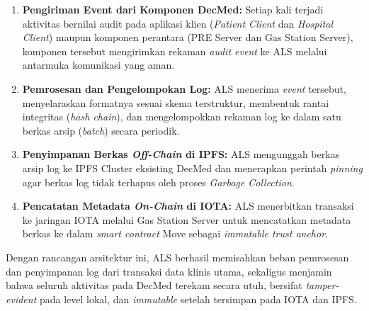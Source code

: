 \begin{enumerate}
    \item \textbf{Pengiriman Event dari Komponen DecMed:} Setiap kali terjadi aktivitas bernilai audit pada aplikasi klien (\textit{Patient Client} dan \textit{Hospital Client}) maupun komponen perantara (PRE Server dan Gas Station Server), komponen tersebut mengirimkan rekaman \textit{audit event} ke ALS melalui antarmuka komunikasi yang aman.
    \item \textbf{Pemrosesan dan Pengelompokan Log:} ALS menerima \textit{event} tersebut, menyelaraskan formatnya sesuai skema terstruktur, membentuk rantai integritas (\textit{hash chain}), dan mengelompokkan rekaman log ke dalam satu berkas arsip (\textit{batch}) secara periodik.
    \item \textbf{Penyimpanan Berkas \textit{Off-Chain} di IPFS:} ALS mengunggah berkas arsip log ke IPFS Cluster eksisting DecMed dan menerapkan perintah \textit{pinning} agar berkas log tidak terhapus oleh proses \textit{Garbage Collection}.
    \item \textbf{Pencatatan Metadata \textit{On-Chain} di IOTA:} ALS menerbitkan transaksi ke jaringan IOTA melalui Gas Station Server untuk mencatatkan metadata berkas ke dalam \textit{smart contract} Move sebagai \textit{immutable trust anchor}.
\end{enumerate}

Dengan rancangan arsitektur ini, ALS berhasil memisahkan beban pemrosesan dan penyimpanan log dari transaksi data klinis utama, sekaligus menjamin bahwa seluruh aktivitas pada DecMed terekam secara utuh, bersifat \textit{tamper-evident} pada level lokal, dan \textit{immutable} setelah tersimpan pada IOTA dan IPFS.